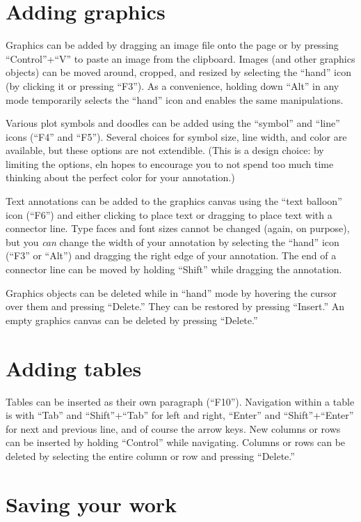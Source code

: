 \documentclass[11pt]{report}
\begin{document}
\section{Adding graphics}

Graphics can be added by dragging an image file onto the page or by
pressing ``Control''+``V'' to paste an image from the
clipboard. Images (and other graphics objects) can be moved around,
cropped, and resized by selecting the ``hand'' icon (by clicking it or
pressing ``F3''). As a convenience, holding down ``Alt'' in any mode
temporarily selects the ``hand'' icon and enables the same
manipulations.

Various plot symbols and doodles can be added using the ``symbol'' and
``line'' icons (``F4'' and ``F5''). Several choices for symbol size,
line width, and color are available, but these options are not
extendible. (This is a design choice: by limiting the options, eln
hopes to encourage you to not spend too much time thinking about the
perfect color for your annotation.) 

Text annotations can be added
to the graphics canvas using the ``text balloon'' icon (``F6'') and
either clicking to place text or dragging to place text with a
connector line. Type faces and font sizes cannot be changed (again, on
purpose), but you \emph{can} change the width of your annotation by
selecting the ``hand'' icon (``F3'' or ``Alt'') and dragging the right
edge of your annotation. The end of a connector line can be moved by
holding ``Shift'' while dragging the annotation.

Graphics objects can be deleted while in ``hand'' mode by hovering the
cursor over them and pressing ``Delete.'' They can be restored by
pressing ``Insert.'' An empty graphics canvas can be deleted by
pressing ``Delete.''

\section{Adding tables}

Tables can be inserted as their own paragraph (``F10''). Navigation
within a table is with ``Tab'' and ``Shift''+``Tab'' for left and
right, ``Enter'' and ``Shift''+``Enter'' for next and previous line,
and of course the arrow keys. New columns or rows can be inserted by
holding ``Control'' while navigating. Columns or rows can be deleted
by selecting the entire column or row and pressing ``Delete.''

\section{Saving your work}
\end{document}
